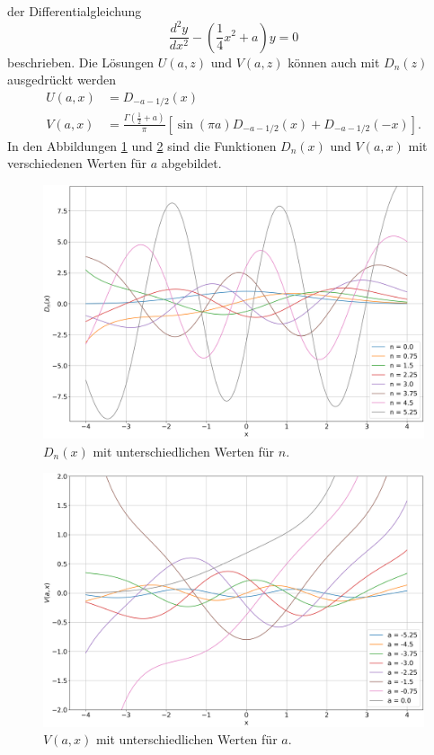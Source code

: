 der Differentialgleichung
\begin{equation}
    \frac{d^2 y}{d x^2} - \left(\frac{1}{4} x^2 + a\right) y = 0
\end{equation}
beschrieben. Die Lösungen $U(a,z)$ und $V(a, z)$ können auch mit $D_n(z)$
ausgedrückt werden
\begin{align}
    U(a,x) &= D_{-a-1/2}(x) \\
    V(a,x) &= \frac{\Gamma \left({\textstyle \frac{1}{2}} + a\right)}{\pi}
    \left[\sin\left(\pi a\right) D_{-a-1/2}(x) + D_{-a-1/2}(-x)\right].
\end{align}
In den Abbildungen \ref{parzyl:fig:dnz} und \ref{parzyl:fig:Vnz} sind 
die Funktionen $D_n(x)$ und $V(a,x)$ mit verschiedenen Werten für $a$ abgebildet.
\begin{figure}
    \centering
    \includegraphics[scale=0.35]{papers/parzyl/img/D_plot.png}
    \caption{$D_n(x)$ mit unterschiedlichen Werten für $n$.}
    \label{parzyl:fig:dnz}
\end{figure}
\begin{figure}
    \centering
    \includegraphics[scale=0.35]{papers/parzyl/img/v_plot.png}
    \caption{$V(a,x)$ mit unterschiedlichen Werten für $a$.}
    \label{parzyl:fig:Vnz}
\end{figure}